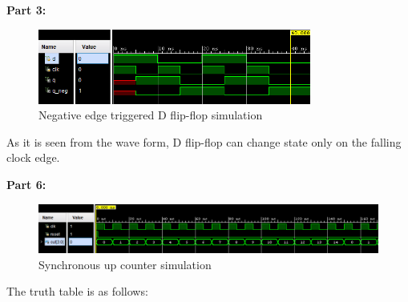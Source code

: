 \documentclass{article}
\begin{document}
	\newpage
	
	\textbf{Part 3:}
	\begin{figure}[h]
		\centering
		\includegraphics[width=0.8\textwidth]{part3.png}
		\caption{Negative edge triggered D flip-flop simulation}
		\centering
	\end{figure}	
	
	As it is seen from the wave form, D flip-flop can change state only on the falling clock edge.

\newpage

	\textbf{Part 6:}
	\begin{figure}[h]
		\centering
		\includegraphics[width=1\textwidth]{part6.png}
		\caption{Synchronous up counter simulation}
		\centering
	\end{figure}	
	
	The truth table is as follows:\\
\end{document}
